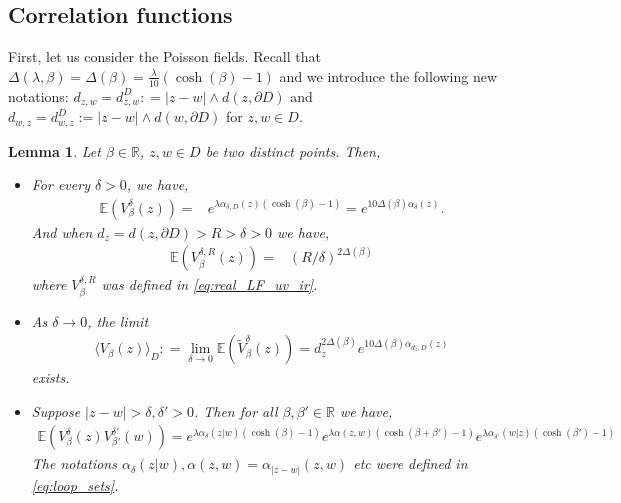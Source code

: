 \documentclass[a4paper, 11pt, reqno]{amsart}
\theoremstyle{definition} \newtheorem{defn}{Definition}[section]
\theoremstyle{remark} \newtheorem{rem}[defn]{Remark}
\theoremstyle{remark} \newtheorem*{rem*}{Remark}
\theoremstyle{plain} \newtheorem{thm}[defn]{Theorem}
\theoremstyle{plain} \newtheorem{lem}[defn]{Lemma}
\theoremstyle{plain} \newtheorem{prop}[defn]{Proposition}
\theoremstyle{plain} \newtheorem{cor}[defn]{Corollary}
\theoremstyle{remark} \newtheorem{exm}[defn]{\textbf{Example}}
\theoremstyle{remark} \newtheorem{exms}[defn]{\textbf{Examples}}
\theoremstyle{remark} \newtheorem*{bl}{}
\numberwithin{equation}{section} %
\newcommand{\R}{\mathbb{R}}
\newcommand{\E}{\mathbb{E}}
\begin{document}
	\subsection{Correlation functions} \label{sec:corr_fns}
	
	First, let us consider the Poisson fields. Recall that $\Delta(\lambda, \beta) = \Delta (\beta) = \frac{\lambda}{10}(\cosh(\beta)-1)$ and we introduce the following new notations: $d_{z,w} = d^D_{z,w} : = |z-w| \wedge d(z, \partial D)$ and $ d_{w,z} = d^D_{w,z} := |z-w| \wedge d(w, \partial D)$ for $z, w \in D$.
	
	\begin{lem}\label{lem:1,2point}
		Let $\beta \in \R$, $z, w \in D$ be two distinct points. Then,
		\begin{itemize}
			\item[(i)] For every $\delta>0$, we have,
			\begin{align}\label{eq:1_point_0}
				\E (V^{\delta}_{\beta}(z)) = & e^{\lambda  \alpha_{\delta, D} (z) (\cosh(\beta) -1) }= e^{10\Delta(\beta) \alpha_{\delta}(z)}.
			\end{align}
			And when $d_z = d(z, \partial D)> R> \delta>0$ we have,
			\begin{align}\label{eq:1_point_UV_IR}
				\E (V^{\delta, R}_{\beta}(z)) = & \left(R/\delta\right)^{2\Delta(\beta)}
			\end{align}
            where $V^{\delta, R}_{\beta}$ was defined in \eqref{eq:real_LF_uv_ir}.

            \item[(ii)] As $\delta \to 0$, the limit
			\begin{align}\label{eq:conv_1_pt_0}
				\langle V_{\beta}(z) \rangle_D : = \lim_{\delta \to 0}\E (\tilde{V}^{\delta}_{\beta}(z)) = d_z^{2\Delta(\beta)} e^{10\Delta(\beta) \alpha_{d_z, D}(z)}
			\end{align}
			exists.
			
			\item[(iii)] Suppose $|z-w|>\delta, \delta' >0$. Then for all $\beta, \beta' \in \R$ we have,
			\begin{align}\label{eq:2point_0}
				\E \left( V^{\delta}_{\beta}(z) V^{\delta'}_{\beta'}(w)\right) 
				= e^{ \lambda \alpha_{\delta}(z|w)(\cosh(\beta) -1)} e^{ \lambda \alpha(z,w) \left(\cosh(\beta+\beta')-1\right)} e^{\lambda\alpha_{\delta'}(w|z)(\cosh(\beta') -1) }
			\end{align}		
            The notations $\alpha_{\delta}(z|w), \alpha(z,w) = \alpha_{|z-w|}(z, w)$ etc were defined in \eqref{eq:loop_sets}.


\end{itemize}
\end{lem}
\end{document}
